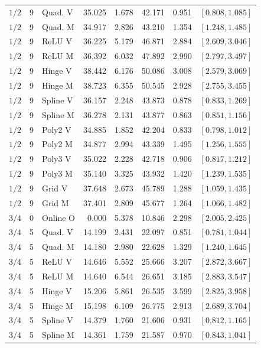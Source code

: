 \begin{longtable}{rrlrrrrr}
$1/2$ & 9 & Quad. V & 35.025 & 1.678 & 42.171 & 0.951 & $[0.808,1.085]$\\
$1/2$ & 9 & Quad. M & 34.917 & 2.826 & 43.210 & 1.354 & $[1.248,1.485]$\\
$1/2$ & 9 & ReLU V & 36.225 & 5.179 & 46.871 & 2.884 & $[2.609,3.046]$\\
$1/2$ & 9 & ReLU M & 36.392 & 6.032 & 47.892 & 2.990 & $[2.797,3.497]$\\
$1/2$ & 9 & Hinge V & 38.442 & 6.176 & 50.086 & 3.008 & $[2.579,3.069]$\\
$1/2$ & 9 & Hinge M & 38.723 & 6.355 & 50.545 & 2.928 & $[2.755,3.455]$\\
$1/2$ & 9 & Spline V & 36.157 & 2.248 & 43.873 & 0.878 & $[0.833,1.269]$\\
$1/2$ & 9 & Spline M & 36.278 & 2.131 & 43.877 & 0.863 & $[0.851,1.156]$\\
$1/2$ & 9 & Poly2 V & 34.885 & 1.852 & 42.204 & 0.833 & $[0.798,1.012]$\\
$1/2$ & 9 & Poly2 M & 34.877 & 2.994 & 43.339 & 1.495 & $[1.256,1.555]$\\
$1/2$ & 9 & Poly3 V & 35.022 & 2.228 & 42.718 & 0.906 & $[0.817,1.212]$\\
$1/2$ & 9 & Poly3 M & 35.140 & 3.325 & 43.932 & 1.420 & $[1.239,1.535]$\\
$1/2$ & 9 & Grid V & 37.648 & 2.673 & 45.789 & 1.288 & $[1.059,1.435]$\\
$1/2$ & 9 & Grid M & 37.401 & 2.809 & 45.677 & 1.264 & $[1.066,1.482]$\\
$3/4$ & 0 & Online O & 0.000 & 5.378 & 10.846 & 2.298 & $[2.005,2.425]$\\
$3/4$ & 5 & Quad. V & 14.199 & 2.431 & 22.097 & 0.851 & $[0.781,1.044]$\\
$3/4$ & 5 & Quad. M & 14.180 & 2.980 & 22.628 & 1.329 & $[1.240,1.645]$\\
$3/4$ & 5 & ReLU V & 14.646 & 5.552 & 25.666 & 3.207 & $[2.872,3.667]$\\
$3/4$ & 5 & ReLU M & 14.640 & 6.544 & 26.651 & 3.185 & $[2.883,3.547]$\\
$3/4$ & 5 & Hinge V & 15.206 & 5.861 & 26.535 & 3.599 & $[2.825,3.958]$\\
$3/4$ & 5 & Hinge M & 15.198 & 6.109 & 26.775 & 2.913 & $[2.689,3.704]$\\
$3/4$ & 5 & Spline V & 14.379 & 1.760 & 21.606 & 0.931 & $[0.812,1.165]$\\
$3/4$ & 5 & Spline M & 14.361 & 1.759 & 21.587 & 0.970 & $[0.843,1.041]$\\

\end{longtable}
